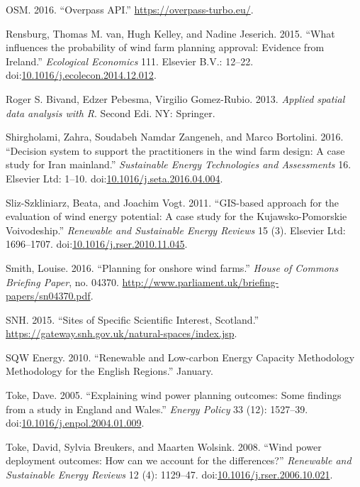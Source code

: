 \documentclass[a4paper,]{article}
\theoremstyle{definition}
\theoremstyle{definition}
\theoremstyle{remark}
\begin{document}
{\hypertarget{ref-Overpass2016}{}
OSM. 2016. ``Overpass API.'' \url{https://overpass-turbo.eu/}.

\hypertarget{ref-VanRensburg20}{}
Rensburg, Thomas M. van, Hugh Kelley, and Nadine Jeserich. 2015. ``What
influences the probability of wind farm planning approval: Evidence from
Ireland.'' \emph{Ecological Economics} 111. Elsevier B.V.: 12--22.
doi:\href{https://doi.org/10.1016/j.ecolecon.2014.12.012}{10.1016/j.ecolecon.2014.12.012}.

\hypertarget{ref-RogerS.BivandEdzerPebesma2013}{}
Roger S. Bivand, Edzer Pebesma, Virgilio Gomez-Rubio. 2013.
\emph{Applied spatial data analysis with R}. Second Edi. NY: Springer.

\hypertarget{ref-Shirgholami2016}{}
Shirgholami, Zahra, Soudabeh Namdar Zangeneh, and Marco Bortolini. 2016.
``Decision system to support the practitioners in the wind farm design:
A case study for Iran mainland.'' \emph{Sustainable Energy Technologies
and Assessments} 16. Elsevier Ltd: 1--10.
doi:\href{https://doi.org/10.1016/j.seta.2016.04.004}{10.1016/j.seta.2016.04.004}.

\hypertarget{ref-Sliz-Szkliniarz2011}{}
Sliz-Szkliniarz, Beata, and Joachim Vogt. 2011. ``GIS-based approach for
the evaluation of wind energy potential: A case study for the
Kujawsko-Pomorskie Voivodeship.'' \emph{Renewable and Sustainable Energy
Reviews} 15 (3). Elsevier Ltd: 1696--1707.
doi:\href{https://doi.org/10.1016/j.rser.2010.11.045}{10.1016/j.rser.2010.11.045}.

\hypertarget{ref-Smith2016}{}
Smith, Louise. 2016. ``Planning for onshore wind farms.'' \emph{House of
Commons Briefing Paper}, no. 04370.
\url{http://www.parliament.uk/briefing-papers/sn04370.pdf}.

\hypertarget{ref-SNH2015}{}
SNH. 2015. ``Sites of Specific Scientific Interest, Scotland.''
\url{https://gateway.snh.gov.uk/natural-spaces/index.jsp}.

\hypertarget{ref-SQWEnergy2010}{}
SQW Energy. 2010. ``Renewable and Low-carbon Energy Capacity Methodology
Methodology for the English Regions.'' January.

\hypertarget{ref-Toke2005}{}
Toke, Dave. 2005. ``Explaining wind power planning outcomes: Some
findings from a study in England and Wales.'' \emph{Energy Policy} 33
(12): 1527--39.
doi:\href{https://doi.org/10.1016/j.enpol.2004.01.009}{10.1016/j.enpol.2004.01.009}.

\hypertarget{ref-Toke2008}{}
Toke, David, Sylvia Breukers, and Maarten Wolsink. 2008. ``Wind power
deployment outcomes: How can we account for the differences?''
\emph{Renewable and Sustainable Energy Reviews} 12 (4): 1129--47.
doi:\href{https://doi.org/10.1016/j.rser.2006.10.021}{10.1016/j.rser.2006.10.021}.

}
\end{document}
